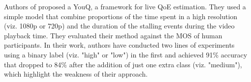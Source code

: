 

Authors of \cite{orsolic2018youtube} proposed a YouQ, a framework for live QoE estimation. They used a simple model that combine proportions of the time spent in a high resolution (viz. 1080p or 720p) and the duration of the stalling events during the video playback time. They evaluated their method against the MOS of human participants. In their work, authors have conducted two lines of experiments using a binary label (viz. "high" or "low") in the first and achieved 91\% accuracy that dropped to 84\% after the addition of just one extra class (viz. "medium"), which highlight the weakness of their approach.

